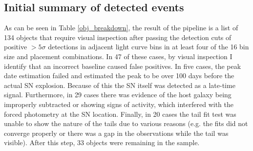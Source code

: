 \documentclass[a4paper,oneside,12pt, class=Latex/Classes/PhDthesisPSnPDF, crop=false]{standalone}
\begin{document}
\subsection{Initial summary of detected events}
\label{results_summary}
As can be seen in Table \ref{obj_breakdown}, the result of the pipeline is a list of 134 objects that require visual inspection after passing the detection cuts of positive $>5\sigma$ detections in adjacent light curve bins in at least four of the 16 bin size and placement combinations. In 47 of these cases, by visual inspection I identify that an incorrect baseline caused false positives. In five cases, the peak date estimation failed and estimated the peak to be over 100 days before the actual SN explosion. Because of this the SN itself was detected as a late-time signal. Furthermore, in 29 cases there was evidence of the host galaxy being improperly subtracted or showing signs of activity, which interfered with the forced photometry at the SN location. Finally, in 20 cases the tail fit test was unable to show the nature of the tails due to various reasons (e.g. the fits did not converge properly or there was a gap in the observations while the tail was visible). After this step, 33 objects were remaining in the sample.
\end{document}
